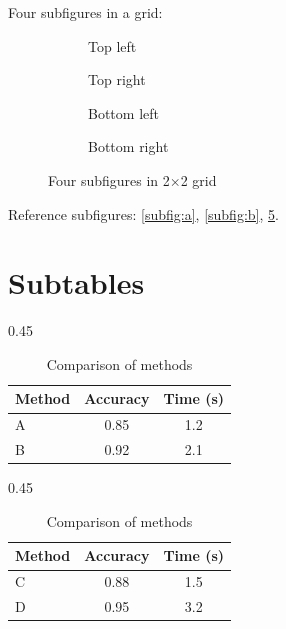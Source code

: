 \documentclass[12pt,a4paper]{article}
\begin{document}
Four subfigures in a grid:
\begin{figure}[htbp]
\centering
\begin{subfigure}[b]{0.45\textwidth}
\centering
{}
\caption{Top left}\label{subfig:tl}
\end{subfigure}
\hfill
\begin{subfigure}[b]{0.45\textwidth}
\centering
{}
\caption{Top right}\label{subfig:tr}
\end{subfigure}

\vspace{1em}
\begin{subfigure}[b]{0.45\textwidth}
\centering
{}
\caption{Bottom left}\label{subfig:bl}
\end{subfigure}
\hfill
\begin{subfigure}[b]{0.45\textwidth}
\centering
{}
\caption{Bottom right}\label{subfig:br}
\end{subfigure}
\caption{Four subfigures in 2$\times$2 grid}\label{fig:four-sub}
\end{figure}

Reference subfigures: \cref{subfig:a}, \cref{subfig:b}, \cref{fig:four-sub}.

\section{Subtables}\label{sec:subtables}
\begin{table}[htbp]
\centering
\begin{subtable}[b]{0.45\textwidth}
\centering
\begin{tabular}{lcc}
\toprule
Method & Accuracy & Time (s) \\
\midrule
A & 0.85 & 1.2 \\
B & 0.92 & 2.1 \\
\bottomrule
\end{tabular}
\caption{Table A}\label{subtab:a}
\end{subtable}
\hfill
\begin{subtable}[b]{0.45\textwidth}
\centering
\begin{tabular}{lcc}
\toprule
Method & Accuracy & Time (s) \\
\midrule
C & 0.88 & 1.5 \\
D & 0.95 & 3.2 \\
\bottomrule
\end{tabular}
\caption{Table B}\label{subtab:b}
\end{subtable}
\caption{Comparison of methods}\label{tab:subtables}
\end{table}
\end{document}
